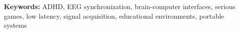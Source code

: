 \textbf{Keywords:} ADHD, EEG synchronization, brain-computer interfaces, serious games, low latency, signal acquisition, educational environments, portable systems 




